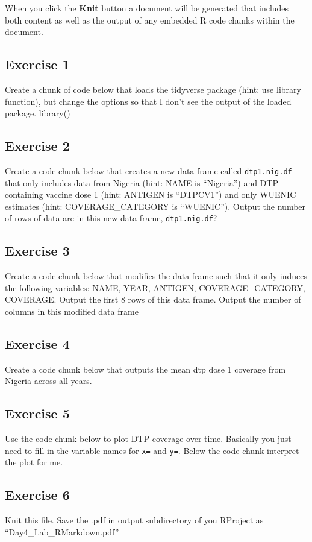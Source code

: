 \documentclass[
]{article}
\begin{document}
When you click the \textbf{Knit} button a document will be generated
that includes both content as well as the output of any embedded R code
chunks within the document.

\hypertarget{exercise-1}{%
\subsection{Exercise 1}\label{exercise-1}}

Create a chunk of code below that loads the tidyverse package (hint: use
library function), but change the options so that I don't see the output
of the loaded package. library()

\hypertarget{exercise-2}{%
\subsection{Exercise 2}\label{exercise-2}}

Create a code chunk below that creates a new data frame called
\texttt{dtp1.nig.df} that only includes data from Nigeria (hint: NAME is
``Nigeria'') and DTP containing vaccine dose 1 (hint: ANTIGEN is
``DTPCV1'') and only WUENIC estimates (hint: COVERAGE\_CATEGORY is
``WUENIC''). Output the number of rows of data are in this new data
frame, \texttt{dtp1.nig.df}?

\hypertarget{exercise-3}{%
\subsection{Exercise 3}\label{exercise-3}}

Create a code chunk below that modifies the data frame such that it only
induces the following variables: NAME, YEAR, ANTIGEN,
COVERAGE\_CATEGORY, COVERAGE. Output the first 8 rows of this data
frame. Output the number of columns in this modified data frame

\hypertarget{exercise-4}{%
\subsection{Exercise 4}\label{exercise-4}}

Create a code chunk below that outputs the mean dtp dose 1 coverage from
Nigeria across all years.

\hypertarget{exercise-5}{%
\subsection{Exercise 5}\label{exercise-5}}

Use the code chunk below to plot DTP coverage over time. Basically you
just need to fill in the variable names for \texttt{x=} and \texttt{y=}.
Below the code chunk interpret the plot for me.

\hypertarget{exercise-6}{%
\subsection{Exercise 6}\label{exercise-6}}

Knit this file. Save the .pdf in output subdirectory of you RProject as
``Day4\_Lab\_RMarkdown.pdf''
\end{document}
